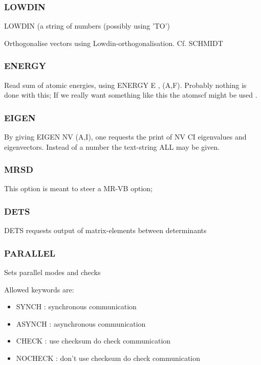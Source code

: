 \documentclass[11pt,fleqn]{article}
\begin{document}
\subsubsection{LOWDIN}

LOWDIN (a string of numbers (possibly using 'TO')

Orthogonalise vectors using Lowdin-orthogonalisation. Cf. SCHMIDT 

\subsubsection{ENERGY}

Read sum of atomic energies, using ENERGY E , (A,F). Probably nothing is done
with this; If we really want something like this the atomscf might be used . 

\subsubsection{EIGEN}

By giving EIGEN NV  (A,I), one requests the print of NV CI eigenvalues and eigenvectors. 
Instead of a number the text-string ALL may be given.

\subsubsection{MRSD}

This option is meant to steer a MR-VB option;

\subsubsection{DETS}

DETS requests output of matrix-elements between determinants

\subsubsection{PARALLEL} 

Sets parallel modes and checks

Allowed keywords are:
\begin{itemize}
\item  SYNCH   : synchronous communication
\item  ASYNCH  : asynchronous communication
\item  CHECK   : use checksum do check communication
\item  NOCHECK : don't use checksum do check communication
\end{itemize}
\end{document}

